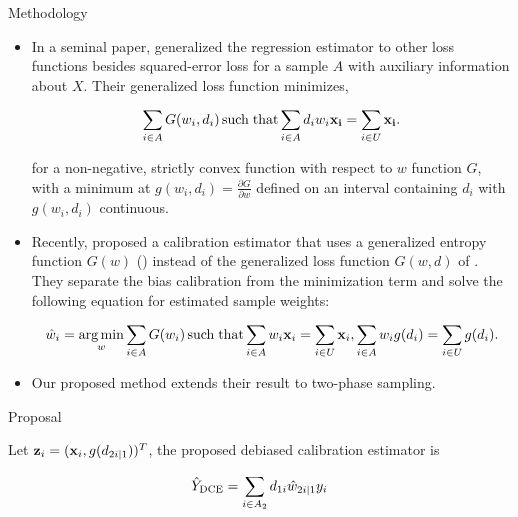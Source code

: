 \documentclass[final]{beamer}
\DeclareMathOperator*{\argmin}{arg\,min}
\DeclareMathOperator*{\suchthat}{such\; that}
\newlength{\colwidth}
\begin{document}
\begin{frame}[t]
\begin{columns}[t]
\begin{column}{\colwidth}
\begin{block}{Methodology}

    \begin{itemize}
      \item In a seminal paper, \cite{deville1992calibration} generalized the
        regression estimator to other loss functions besides squared-error loss
        for a sample $A$ with auxiliary information about $X$. Their generalized
        loss function minimizes,

        $$
        \sum_{i \in A} G(w_{i}, d_{i}) \suchthat \sum_{i \in
        A} d_{i} w_{i} {\bf x_i} = \sum_{i \in U} {\bf x_i}.
        $$

        for a non-negative, strictly convex function with respect to $w$
        function $G$, with a minimum at $g(w_i, d_i) = \frac{\partial G}{\partial
        w}$ defined on an interval containing $d_{i}$ with $g(w_i, d_i)$
        continuous.
    \end{itemize}


    \begin{itemize}
      \item Recently, \cite{kwon2024debiased} proposed a calibration estimator that
        uses a generalized entropy function $G(w)$ (\cite{gneiting2007strictly})
        instead of the generalized loss function $G(w, d)$ of
        \cite{deville1992calibration}. They separate the bias calibration from
        the minimization term and solve the following equation for estimated
        sample weights:

        $$
        \hat w_{i} = \argmin_{w} \sum_{i \in A} G(w_i)
        \suchthat \sum_{i \in A} w_{i} {\bf{x}}_i = 
        \sum_{i \in U} {\bf{x}}_i,
        \sum_{i \in A} w_i g(d_i) = \sum_{i \in U} g(d_i) .
        $$

      \item Our proposed method extends their result to two-phase sampling.
    \end{itemize}

  \end{block}

  \begin{alertblock}{Proposal}

    Let ${\bf{z}}_i = ({\bf x}_i, g(d_{2i|1}))^T$, the proposed debiased
    calibration estimator is 
    \vspace{-1.0cm}

    \begin{equation}
    \hat Y_{\rm{DCE}} = \sum_{i \in A_2} d_{1i} \hat w_{2i|1} y_i
    \end{equation}


\end{alertblock}
\end{column}
\end{columns}
\end{frame}
\end{document}
